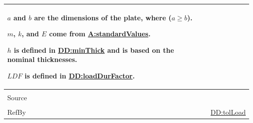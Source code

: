 \documentclass[12pt]{article}
\begin{document}
\begin{minipage}{\textwidth}
\begin{tabular}{>{\raggedright}p{}>{\raggedright\arraybackslash}p{}}
        $a$ and $b$ are the dimensions of the plate, where ($a\geq{}b$).
        
        $m$, $k$, and $E$ come from \hyperref[assumpSV]{A:standardValues}.
        
        $h$ is defined in \hyperref[DD:minThick]{DD:minThick} and is based on the nominal thicknesses.
        
        $\mathit{LDF}$ is defined in \hyperref[DD:loadDurFactor]{DD:loadDurFactor}.
        
\\ \midrule \\
Source & \cite{astm2009}
         
\\ \midrule \\
RefBy & \hyperref[DD:tolLoad]{DD:tolLoad}
        
\\ \bottomrule
\end{tabular}
\end{minipage}
\end{document}
